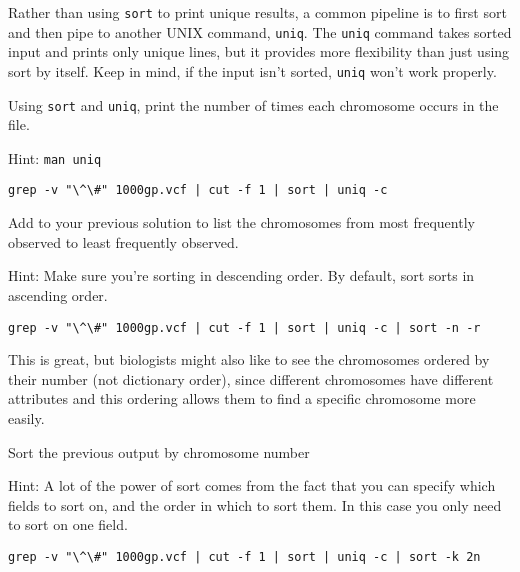\begin{note}
Rather than using \texttt{sort} to print unique results, a common pipeline is to first sort and then pipe to another UNIX command, \texttt{uniq}. The \texttt{uniq} command takes sorted input and prints only unique lines, but it provides more flexibility than just using sort by itself. Keep in mind, if the input isn't sorted, \texttt{uniq} won't work properly.
\end{note}

\begin{questions}
Using \texttt{sort} and \texttt{uniq}, print the number of times each chromosome occurs in the file.

Hint: \texttt{man uniq}
\begin{answer}
\begin{lstlisting}
grep -v "\^\#" 1000gp.vcf | cut -f 1 | sort | uniq -c
\end{lstlisting}
\end{answer}
Add to your previous solution to list the chromosomes from most frequently observed to least frequently observed.

Hint: Make sure you're sorting in descending order. By default, sort sorts in ascending order.
\begin{answer}
\begin{lstlisting}
grep -v "\^\#" 1000gp.vcf | cut -f 1 | sort | uniq -c | sort -n -r
\end{lstlisting}
\end{answer}
\end{questions}


\begin{note}
This is great, but biologists might also like to see the chromosomes ordered by their number (not dictionary order), since different chromosomes have different attributes and this ordering allows them to find a specific chromosome more easily.
\end{note}
\begin{questions}
Sort the previous output by chromosome number

Hint: A lot of the power of sort comes from the fact that you can specify which fields to sort on, and the order in which to sort them. In this case you only need to sort on one field.
\begin{answer}
\begin{lstlisting}
grep -v "\^\#" 1000gp.vcf | cut -f 1 | sort | uniq -c | sort -k 2n
\end{lstlisting}
\end{answer}
\end{questions}
